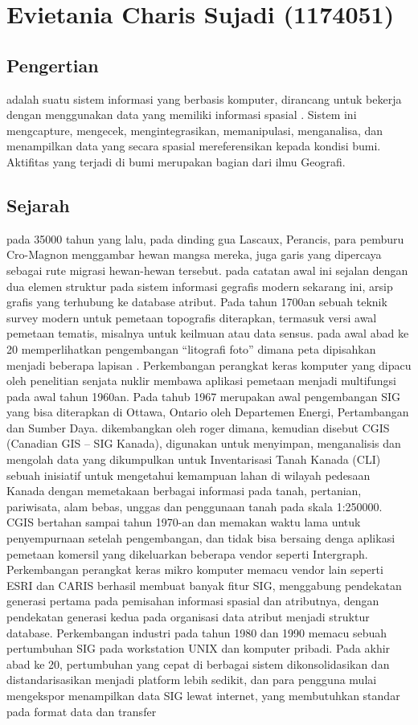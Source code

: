 \section{Evietania Charis Sujadi (1174051)}
\subsection{Pengertian}
adalah suatu sistem informasi yang berbasis komputer, dirancang untuk bekerja dengan menggunakan data yang memiliki informasi spasial . Sistem ini mengcapture, mengecek, mengintegrasikan, memanipulasi, menganalisa, dan menampilkan data yang secara spasial mereferensikan kepada kondisi bumi. \hfill\break
Aktifitas yang terjadi di bumi merupakan bagian dari ilmu Geografi.\hfill\break
\subsection{Sejarah}
pada 35000 tahun yang lalu, pada dinding gua Lascaux, Perancis, para pemburu Cro-Magnon menggambar hewan mangsa mereka, juga garis yang dipercaya sebagai rute migrasi hewan-hewan tersebut. pada catatan awal ini sejalan dengan dua elemen struktur pada sistem informasi gegrafis modern sekarang ini, arsip grafis yang terhubung ke database atribut.\hfill\break
Pada tahun 1700an sebuah teknik survey modern untuk pemetaan topografis diterapkan, termasuk versi awal pemetaan tematis, misalnya untuk keilmuan atau data sensus.\hfill\break
pada awal abad ke 20 memperlihatkan pengembangan “litografi foto” dimana peta dipisahkan menjadi beberapa lapisan . Perkembangan perangkat keras komputer yang dipacu oleh penelitian senjata nuklir membawa aplikasi pemetaan menjadi multifungsi pada awal tahun 1960an.\hfill\break
Pada tahub 1967 merupakan awal pengembangan SIG yang bisa diterapkan di Ottawa, Ontario oleh Departemen Energi, Pertambangan dan Sumber Daya. dikembangkan oleh roger dimana, kemudian disebut CGIS (Canadian GIS – SIG Kanada), digunakan untuk menyimpan, menganalisis dan mengolah data yang dikumpulkan untuk Inventarisasi Tanah Kanada (CLI) sebuah inisiatif untuk mengetahui kemampuan lahan di wilayah pedesaan Kanada dengan memetakaan berbagai informasi pada tanah, pertanian, pariwisata, alam bebas, unggas dan penggunaan tanah pada skala 1:250000.\hfill\break
CGIS bertahan sampai tahun 1970-an dan memakan waktu lama untuk penyempurnaan setelah pengembangan, dan tidak bisa bersaing denga aplikasi pemetaan komersil yang dikeluarkan beberapa vendor seperti Intergraph. Perkembangan perangkat keras mikro komputer memacu vendor lain seperti ESRI dan CARIS berhasil membuat banyak fitur SIG, menggabung pendekatan generasi pertama pada pemisahan informasi spasial dan atributnya, dengan pendekatan generasi kedua pada organisasi data atribut menjadi struktur database. Perkembangan industri pada tahun 1980 dan 1990 memacu sebuah pertumbuhan SIG pada workstation UNIX dan komputer pribadi. Pada akhir abad ke 20, pertumbuhan yang cepat di berbagai sistem dikonsolidasikan dan distandarisasikan menjadi platform lebih sedikit, dan para pengguna mulai mengekspor menampilkan data SIG lewat internet, yang membutuhkan standar pada format data dan transfer

